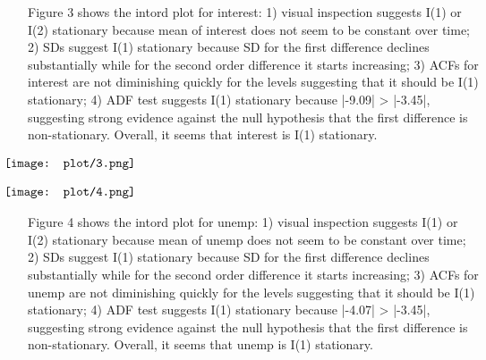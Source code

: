 \documentclass[12pt, times]{article}
\begin{document}
\vspace{-1.5em}
\hspace{1.5em}Figure 3 shows the intord plot for interest: 1) visual inspection suggests I(1) or I(2) stationary because mean of interest does not seem to be constant over time; 2) SDs suggest I(1) stationary because SD for the first difference declines substantially while for the second order difference it starts increasing; 3) ACFs for interest are not diminishing quickly for the levels suggesting that it should be I(1) stationary; 4) ADF test suggests I(1) stationary because |-9.09| > |-3.45|, suggesting strong evidence against the null hypothesis that the first difference is non-stationary. Overall, it seems that interest is I(1) stationary.
\begin{figure}[H]
  \begin{center}
    $
      \begin{array}
        [c]{cc}%
        \makebox[0pt]{\texttt{[image: plot/3.png]}}
      \end{array}
    $
  \end{center}
  \vspace{-1.5em}
  \caption{}
\end{figure}
\vspace{-1.5em}

\begin{figure}[H]
  \begin{center}
    $
      \begin{array}
        [c]{cc}%
        \makebox[0pt]{\texttt{[image: plot/4.png]}}
      \end{array}
    $
  \end{center}
  \vspace{-1.5em}
  \caption{}
\end{figure}
\vspace{-1.5em}
\hspace{1.5em}Figure 4 shows the intord plot for unemp: 1) visual inspection suggests I(1) or I(2) stationary because mean of unemp does not seem to be constant over time; 2) SDs suggest I(1) stationary because SD for the first difference declines substantially while for the second order difference it starts increasing; 3) ACFs for unemp are not diminishing quickly for the levels suggesting that it should be I(1) stationary; 4) ADF test suggests I(1) stationary because |-4.07| > |-3.45|, suggesting strong evidence against the null hypothesis that the first difference is non-stationary. Overall, it seems that unemp is I(1) stationary.
\vspace{-1.5em}
\end{document}
